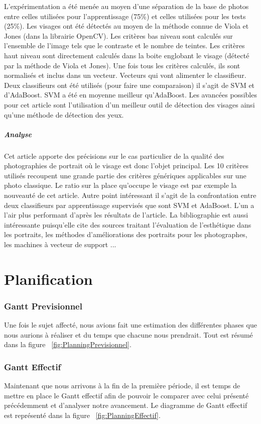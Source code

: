 \documentclass[11pt, french,screen]{report-rd-info}
\begin{document}
L'expérimentation a été menée au moyen d’une séparation de la base de photos entre celles utilisées pour l’apprentissage (75\%) et celles utilisées pour les tests (25\%). Les visages ont été détectés au moyen de la méthode connue de Viola et Jones (dans la librairie OpenCV).
Les critères bas niveau sont calculés sur l’ensemble de l’image tels que le contraste et le nombre de teintes. Les critères haut niveau sont directement calculés dans la boite englobant le visage (détecté par la méthode de Viola et Jones). Une fois tous les critères calculés, ils sont normalisés et inclus dans un vecteur. Vecteurs qui vont alimenter le classifieur. Deux classifieurs ont été utilisés (pour faire une comparaison) il s’agit de SVM et d’AdaBoost. SVM a été en moyenne meilleur qu’AdaBoost.
Les avancées possibles pour cet article sont l’utilisation d’un meilleur outil de détection des visages ainsi qu’une méthode de détection des yeux.
\paragraph{Analyse}
Cet article apporte des précisions sur le cas particulier de la qualité des photographies de portrait où le visage est donc l’objet principal. Les 10 critères utilisés recoupent une grande partie des critères génériques applicables sur une photo classique. Le ratio sur la place qu’occupe le visage est par exemple la nouveauté de cet article.
Autre point intéressant il s’agit de la confrontation entre deux classifieurs par apprentissage supervisés que sont SVM et AdaBoost. L’un a l’air plus performant d’après les résultats de l’article. La bibliographie est aussi intéressante puisqu’elle cite des sources traitant l’évaluation de l’esthétique dans les portraits, les méthodes d’améliorations des portraits pour les photographes, les machines à vecteur de support ...


\chapter{Planification}

\subsection{Gantt Previsionnel}
Une fois le sujet affecté, nous avions fait une estimation des différentes phases que nous aurions à réaliser et du temps que chacune nous prendrait. Tout est résumé dans la figure ~\ref{fig:PlanningPrevisionnel}.

\subsection{Gantt Effectif}
Maintenant que nous arrivons à la fin de la première période, il est temps de mettre en place le Gantt effectif afin de pouvoir le comparer avec celui présenté précédemment et d’analyser notre avancement. Le diagramme de Gantt effectif est représenté dans la figure ~\ref{fig:PlanningEffectif}.
\end{document}

